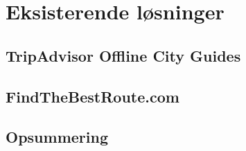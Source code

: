 \section{Eksisterende løsninger}

\subsection{TripAdvisor Offline City Guides}

\subsection{FindTheBestRoute.com}

\subsection{Opsummering}

